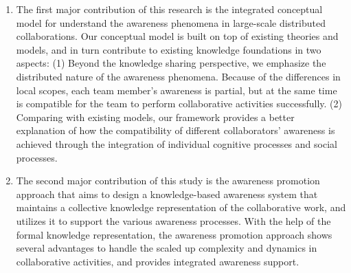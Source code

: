 \begin{enumerate}
	\item The first major contribution of this research is the integrated conceptual model for understand the awareness phenomena in large-scale distributed collaborations. Our conceptual model is built on top of existing theories and models, and in turn contribute to existing knowledge foundations in two aspects: (1) Beyond the knowledge sharing perspective, we emphasize the distributed nature of the awareness phenomena. Because of the differences in local scopes, each team member’s awareness is partial, but at the same time is compatible for the team to perform collaborative activities successfully. (2) Comparing with existing models, our framework provides a better explanation of how the compatibility of different collaborators’ awareness is achieved through the integration of individual cognitive processes and social processes.
	\item The second major contribution of this study is the awareness promotion approach that aims to design a knowledge-based awareness system that maintains a collective knowledge representation of the collaborative work, and utilizes it to support the various awareness processes. With the help of the formal knowledge representation, the awareness promotion approach shows several advantages to handle the scaled up complexity and dynamics in collaborative activities, and provides integrated awareness support.
\end{enumerate}
